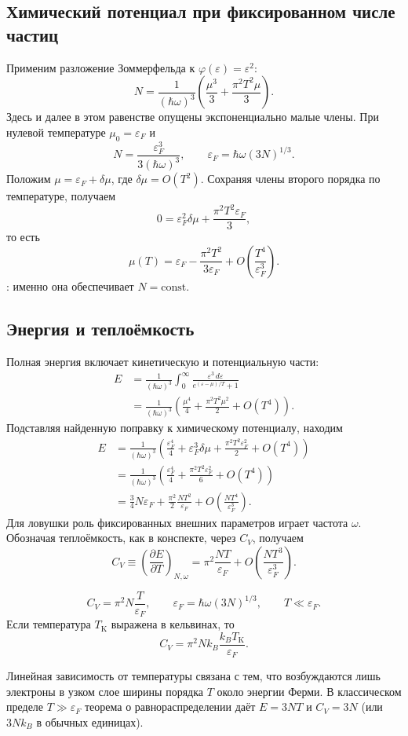\documentclass[../final.tex]{subfiles}
\begin{document}
\subsection*{Химический потенциал при фиксированном числе частиц}

Применим разложение Зоммерфельда к $\varphi(\varepsilon)=\varepsilon^2$:
\[
N=\frac{1}{(\hbar\omega)^3}
    \left(\frac{\mu^3}{3}+\frac{\pi^2T^2\mu}{3}\right).
\]
Здесь и далее в этом равенстве опущены экспоненциально малые члены.
При нулевой температуре $\mu_0=\varepsilon_F$ и
\[
N=\frac{\varepsilon_F^3}{3(\hbar\omega)^3},\qquad
    \varepsilon_F=\hbar\omega(3N)^{1/3}.
\]
Положим $\mu=\varepsilon_F+\delta\mu$, где $\delta\mu=O(T^2)$.
Сохраняя члены второго порядка по температуре, получаем
\[
0=\varepsilon_F^2\delta\mu
    +\frac{\pi^2T^2\varepsilon_F}{3},
\]
то есть
\[
\mu(T)=\varepsilon_F-\frac{\pi^2T^2}{3\varepsilon_F}
    +O\left(\frac{T^4}{\varepsilon_F^3}\right).
\]
: именно она обеспечивает $N=\mathrm{const}$.

\subsection*{Энергия и теплоёмкость}

Полная энергия включает кинетическую и потенциальную части:
\begin{align*}
    E&=\frac{1}{(\hbar\omega)^3}
    \int_0^\infty\frac{\varepsilon^3\,d\varepsilon}
    {e^{(\varepsilon-\mu)/T}+1}\\
    &=\frac{1}{(\hbar\omega)^3}
    \left(\frac{\mu^4}{4}+\frac{\pi^2T^2\mu^2}{2}+O(T^4)\right).
\end{align*}
Подставляя найденную поправку к химическому потенциалу, находим
\begin{align*}
    E&=\frac{1}{(\hbar\omega)^3}
    \left(\frac{\varepsilon_F^4}{4}
    +\varepsilon_F^3\delta\mu
    +\frac{\pi^2T^2\varepsilon_F^2}{2}+O(T^4)\right)\\
    &=\frac{1}{(\hbar\omega)^3}
    \left(\frac{\varepsilon_F^4}{4}
    +\frac{\pi^2T^2\varepsilon_F^2}{6}+O(T^4)\right)\\
    &=\frac34N\varepsilon_F
    +\frac{\pi^2}{2}\frac{NT^2}{\varepsilon_F}
    +O\left(\frac{NT^4}{\varepsilon_F^3}\right).
\end{align*}
Для ловушки роль фиксированных внешних параметров играет частота
$\omega$. Обозначая теплоёмкость, как в конспекте, через $C_V$, получаем
\[
C_V\equiv\left(\frac{\partial E}{\partial T}\right)_{N,\omega}
    =\pi^2\frac{NT}{\varepsilon_F}
    +O\left(\frac{NT^3}{\varepsilon_F^3}\right).
\]

\answer
\[
C_V=\pi^2N\frac{T}{\varepsilon_F},\qquad
    \varepsilon_F=\hbar\omega(3N)^{1/3},\qquad T\ll\varepsilon_F.
\]
Если температура $T_{\mathrm K}$ выражена в кельвинах, то
\[
C_V=\pi^2Nk_B\frac{k_BT_{\mathrm K}}{\varepsilon_F}.
\]

Линейная зависимость от температуры связана с тем, что возбуждаются
лишь электроны в узком слое ширины порядка $T$ около энергии Ферми.
В классическом пределе $T\gg\varepsilon_F$ теорема о равнораспределении
даёт $E=3NT$ и $C_V=3N$ (или $3Nk_B$ в обычных единицах).
\end{document}
